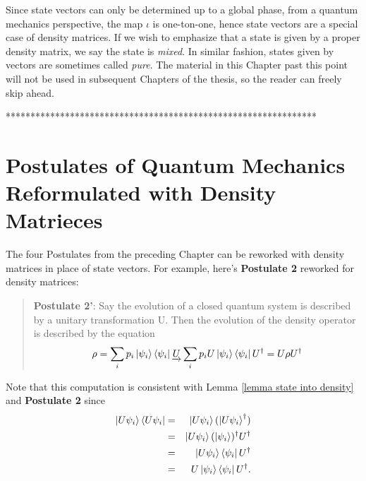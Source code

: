 Since state vectors can only be determined up to a global phase, from a quantum mechanics perspective, the map $\iota$ is one-ton-one, hence state vectors are a special case of density matrices.  If we wish to emphasize that a state is given by a proper density matrix, we say the state is \textit{mixed}.  In similar fashion, states given by vectors are sometimes called {\emph{pure}}.  The material in this Chapter past this point will not be used in subsequent Chapters of the thesis, so the reader can freely skip ahead.


***************************************************************
\section{Postulates of Quantum Mechanics Reformulated with Density Matrieces}

The four Postulates from the preceding Chapter can be reworked with density matrices in place of state vectors. For example, here's \textbf{Postulate 2} reworked for density matrices:
\begin{quote}
    {\bf{Postulate 2'}}: Say the evolution of a closed quantum system is described by a unitary transformation U. Then the evolution of the density operator is described by the equation
    \begin{equation}
        \rho=\sum_i p_i \ket{\psi_i}\bra{\psi_i}	\underrightarrow{U}\sum_i p_i U \ket{\psi_i}\bra{\psi_i}U^\dagger=U \rho U^\dagger
    \end{equation}
\end{quote}

Note that this computation is consistent with Lemma \ref{lemma state into density} and {\bf{Postulate 2}} since
\begin{eqnarray}
\ket{U \psi_i}\bra{U \psi_i}&=& \ket{U \psi_i}(\ket{U \psi_i}^\dagger)\\
&=& \ket{U\psi_i}(\ket{\psi_i})^\dagger U^\dagger\\
&=& \ket{U \psi_i} \bra{\psi_i}U^\dagger\\
&=& U \ket{\psi_i}\bra{\psi_i}U^\dagger.
\end{eqnarray}

